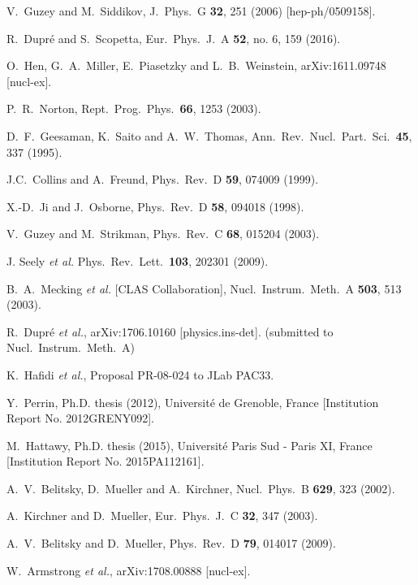 \documentclass[twocolumn,nofootinbib,showpacs,prl,superscriptaddress,secnumarabic,amssymb,nobibnotes,aps,floatfix]{revtex4}
\begin{document}
\begin{thebibliography}{99}
  V.~Guzey and M.~Siddikov,
  J.\ Phys.\ G {\bf 32}, 251 (2006)
  [hep-ph/0509158].

  R.~Dupr\'e and S.~Scopetta,
  Eur.\ Phys.\ J.\ A {\bf 52}, no. 6, 159 (2016).

  O.~Hen, G.~A.~Miller, E.~Piasetzky and L.~B.~Weinstein,
  arXiv:1611.09748 [nucl-ex].

  P.~R.~Norton,
  Rept.\ Prog.\ Phys.\  {\bf 66}, 1253 (2003).

  D.~F.~Geesaman, K.~Saito and A.~W.~Thomas,
  Ann.\ Rev.\ Nucl.\ Part.\ Sci.\  {\bf 45}, 337 (1995).

J.C.~Collins and A.~Freund, 
Phys.\ Rev.\ D {\bf 59}, 074009 (1999).

X.-D.~Ji and J.~Osborne, 
Phys.\ Rev.\ D {\bf 58}, 094018 (1998).

  V.~Guzey and M.~Strikman,
  Phys.\ Rev.\ C {\bf 68}, 015204 (2003).

J. Seely {\it et al.} 
Phys.\ Rev.\ Lett.\ {\bf 103}, 202301 (2009).

B.~A.~Mecking {\it et al.} [CLAS Collaboration],
   Nucl.\ Instrum.\ Meth.\ A {\bf 503}, 513 (2003).

  R.~Dupr\'e {\it et al.},
  arXiv:1706.10160 [physics.ins-det].
  (submitted to Nucl.\ Instrum.\ Meth.\ A)

   K.~Hafidi {\it et al.},
   Proposal PR-08-024 to JLab PAC33.

Y.~Perrin, Ph.D. thesis (2012), Universit{\'e} de Grenoble, France
[Institution Report No. 2012GRENY092].

M.~Hattawy, Ph.D. thesis (2015), Universit{\'e} Paris Sud - Paris XI, France 
[Institution Report No. 2015PA112161].

A.~V.~Belitsky, D.~Mueller and A.~Kirchner,
Nucl.\ Phys.\ B {\bf 629}, 323 (2002).

A.~Kirchner and D.~Mueller, 
Eur.\ Phys.\ J.\ C {\bf 32}, 347 (2003).

A.~V.~Belitsky and D.~Mueller,
Phys.\ Rev.\ D {\bf 79}, 014017 (2009).

  W.~Armstrong {\it et al.},
  arXiv:1708.00888 [nucl-ex].


\end{thebibliography}
\end{document}
